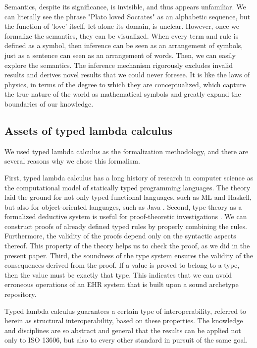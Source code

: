\documentclass[preprint,3p,onecolumn,times,review]{elsarticle}
\begin{document}
Semantics, despite its significance, is invisible, and thus appears unfamiliar. We can literally see the phrase "Plato loved Socrates" as an alphabetic sequence, but the function of 'love' itself, let alone its domain, is unclear. However, once we formalize the semantics, they can be visualized. When every term and rule is defined as a symbol, then inference can be seen as an arrangement of symbols, just as a sentence can seen as an arrangement of words. Then, we can easily explore the semantics. The inference mechanism rigorously excludes invalid results and derives novel results that we could never foresee. It is like the laws of physics, in terms of the degree to which they are conceptualized, which capture the true nature of the world as mathematical symbols and greatly expand the boundaries of our knowledge.


\subsection{Assets of typed lambda calculus}

We used typed lambda calculus as the formalization methodology, and there are several reasons why we chose this formalism.

First, typed lambda calculus has a long history of research in computer science as the computational model of statically typed programming languages. The theory laid the ground for not only typed functional languages, such as ML and Haskell, but also for object-oriented languages, such as Java \cite{igarashi01:_feath_java,barendregt13:_lambd_calcul_types}.
Second, type theory as a formalized deductive system is useful for proof-theoretic investigations \cite[p.9]{program13:_homot_type_theor}. We can construct proofs of already defined typed rules by properly combining the rules. Furthermore, the validity of the proofs depend only on the syntactic aspects thereof. This property of the theory helps us to check the proof, as we did in the present paper.
Third, the soundness of the type system ensures the validity of the consequences derived from the proof. If a value is proved to belong to a type, then the value must be exactly that type. This indicates that we can avoid erroneous operations of an EHR system that is built upon a sound archetype repository.

Typed lambda calculus guarantees a certain type of interoperability, referred to herein as structural interoperability, based on these properties. The knowledge and disciplines are so abstract and general that the results can be applied not only to ISO 13606, but also to every other standard in pursuit of the same goal.
\end{document}
